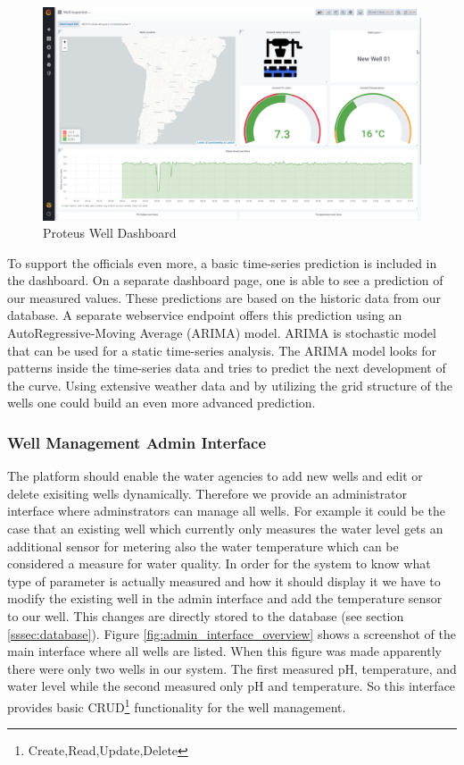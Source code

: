 \documentclass[11pt, letterpaper]{article}
\begin{document}
\begin{figure}[ht!]
	\centering
	\includegraphics[width=12cm]{figures/Well_Inspection.png}
	\caption{Proteus Well Dashboard}
	\label{fig:grafana}
\end{figure}

To support the officials even more, a basic time-series prediction is included in the dashboard. On a separate dashboard page, one is able to see a prediction of our measured values. These predictions are based on the historic data from our database. A separate webservice endpoint offers this prediction using an AutoRegressive-Moving Average (ARIMA) model\cite{ARIMA}. ARIMA is stochastic model that can be used for a static time-series analysis. The ARIMA model looks for patterns inside the time-series data and tries to predict the next development of the curve. Using extensive weather data and by utilizing the grid structure of the wells one could build an even more advanced prediction. 

\subsubsection{Well Management Admin Interface}
The platform should enable the water agencies to add new wells and edit or delete exisiting wells dynamically. Therefore we provide an administrator interface where adminstrators can manage all wells. For example it could be the case that an existing well which currently only measures the water level gets an additional sensor for metering also the water temperature which can be considered a measure for water quality. In order for the system to know what type of parameter is actually measured and how it should display it we have to modify the existing well in the admin interface and add the temperature sensor to our well. This changes are directly stored to the database (see section \ref{sssec:database}). Figure \ref{fig:admin_interface_overview} shows a screenshot of the main interface where all wells are listed. When this figure was made apparently there were only two wells in our system. The first measured pH, temperature, and water level while the second measured only pH and temperature.
So this interface provides basic CRUD\footnote{Create,Read,Update,Delete} functionality for the well management.
\end{document}
